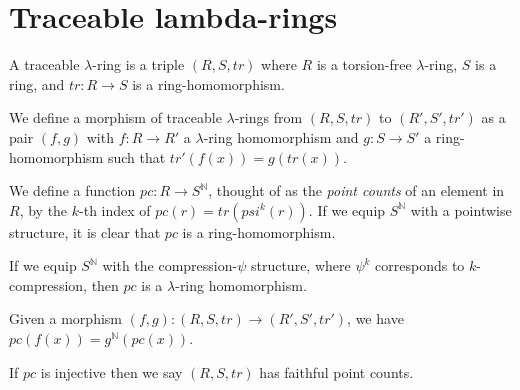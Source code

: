 
\section{Traceable lambda-rings}

\begin{definition}
  A traceable $\lambda$-ring is a triple $(R, S, tr)$ where $R$ is a torsion-free $\lambda$-ring, $S$ is a ring, and $tr: R \to S$ is a ring-homomorphism.  
\end{definition}

\begin{definition}
  We define a morphism of traceable $\lambda$-rings from $(R, S, tr)$ to $(R', S', tr')$ as a pair $(f, g)$ with $f : R \to R'$ a $\lambda$-ring homomorphism and $g : S \to S'$ a ring-homomorphism such that $tr'(f(x)) = g(tr(x))$.
\end{definition}

\begin{definition}
  We define a function $pc : R \to S^{\mathbb{N}}$, thought of as the \emph{point counts} of an element in $R$, by the $k$-th index of $pc(r) = tr(psi^k(r))$. If we equip $S^{\mathbb{N}}$ with a pointwise structure, it is clear that $pc$ is a ring-homomorphism. 
\end{definition}

\begin{proposition}
  If we equip $S^{\mathbb{N}}$ with the compression-$\psi$ structure, where $\psi^k$ corresponds to $k$-compression, then $pc$ is a $\lambda$-ring homomorphism.
\end{proposition}

\begin{proposition}
  Given a morphism $(f, g) : (R, S, tr) \to (R', S', tr')$, we have $pc(f(x)) = g^{\mathbb{N}}(pc(x))$.
\end{proposition}

\begin{definition}
  If $pc$ is injective then we say $(R, S, tr)$ has faithful point counts. 
\end{definition}


